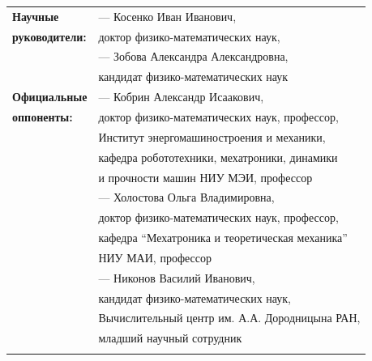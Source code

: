     \begin{tabular}{@{}p{5cm}p{16cm}}
        \textbf{Научные}               & --- Косенко Иван Иванович, \\
        \textbf{руководители:}         & доктор физико-математических наук,\\
                                       & --- Зобова Александра Александровна,\\
                                       & кандидат физико-математических наук
        \vspace{4mm} \\
        \textbf{Официальные}            & --- Кобрин Александр Исаакович, \\
        \textbf{оппоненты:}             & доктор физико-математических наук, профессор, \\
                                        & Институт энергомашиностроения и механики, \\
                                        & кафедра робототехники, мехатроники, динамики \\
                                        \vspace{4mm}
                                        & и прочности машин НИУ МЭИ, профессор \\
                                        & --- Холостова Ольга Владимировна, \\
                                        & доктор физико-математических наук, профессор, \\
                                        & кафедра ``Мехатроника и теоретическая механика'' \\
                                        \vspace{4mm}
                                        & НИУ МАИ, профессор \\
                                        & --- Никонов Василий Иванович, \\
                                        & кандидат физико-математических наук, \\
                                        & Вычислительный центр им. А.А. Дородницына РАН, \\
                                        & младший научный сотрудник\\
                                        \vspace{4mm}
    \end{tabular}  
\par\bigskip

